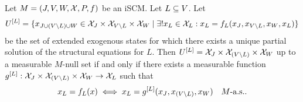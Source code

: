 \begin{Prp}\label{prp:scm_partial_solvability}
  Let $M = \left ( J, V, W, \mathcal{X}, P, f \right )$ be an iSCM.
  Let $L \subseteq V$.  
  Let 
  $$U^{[L]} = \{x_{J \cup (V\setminus L) \cup W} \in \mathcal{X}_J \times \mathcal{X}_{V\setminus L} \times \mathcal{X}_W \mid \exists! x_L \in \mathcal{X}_L : x_L = f_L(x_J,x_{V\setminus L},x_W,x_L)\}$$
  be the set of extended exogenous states for which there exists a unique partial solution of the structural equations for $L$.
  Then $U^{[L]} = \mathcal{X}_J \times \mathcal{X}_{(V\setminus L)} \times \mathcal{X}_W$ up to a measurable $M$-null set \TODOmas if and only if
  there exists a measurable function $g^{[L]}: \mathcal{X}_{J} \times \mathcal{X}_{(V\setminus L)} \times \mathcal{X}_{W} \to \mathcal{X}_L$ such that
    $$x_L = f_L(x) \iff x_L = g^{[L]}(x_J,x_{(V\setminus L)},x_W)\quad M\text{-a.s.}.$$
\end{Prp}
